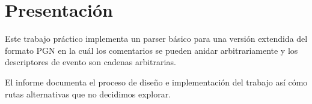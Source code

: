 \section{Presentación}

Este trabajo práctico implementa un parser básico para una versión extendida del formato PGN en la cuál los comentarios se pueden anidar arbitrariamente y los descriptores de evento son cadenas arbitrarias.

El informe documenta el proceso de diseño e implementación del trabajo así cómo rutas alternativas que no decidimos explorar.